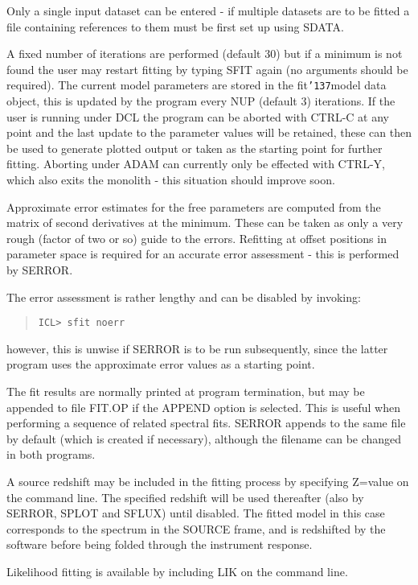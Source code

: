 \documentclass{book}
\renewcommand{\_}{{\tt\char'137}}     %
\begin{document}
Only a single input dataset can be entered - if multiple datasets
are to be fitted a file containing references to them must be
first set up using SDATA.
 
A fixed number of iterations are performed (default 30) but if a
minimum is not found the user may restart fitting by typing SFIT
again (no arguments should be required). The current model
parameters are stored in the fit\_model data object, this is
updated by the program every NUP (default 3) iterations. If the
user is running under DCL the program can be aborted with CTRL-C at
any point and the last update to the parameter values will be
retained, these can then be used to generate plotted output or
taken as the starting point for further fitting. Aborting under
ADAM can currently only be effected with CTRL-Y, which also exits
the monolith - this situation should improve soon.
 
Approximate error estimates for the free parameters are computed
from the matrix of second derivatives at the minimum. These can
be taken as only a very rough (factor of two or so) guide to the
errors. Refitting at offset positions in parameter space is
required for an accurate error assessment - this is performed by
SERROR.
 
The error assessment is rather lengthy and can be disabled by
invoking:
\begin{quote}\begin{verbatim}
ICL> sfit noerr
\end{verbatim}\end{quote}
however, this is unwise if SERROR is to be run subsequently,
since the latter program uses the approximate error values as a
starting point.
 
The fit results are normally printed at program termination, but
may be appended to file FIT.OP if the APPEND option is selected.
This is useful when performing a sequence of related spectral
fits. SERROR appends to the same file by default (which is created
if necessary), although the filename can be changed in both programs.
 
A source redshift may be included in the fitting process by
specifying Z=value on the command line. The specified redshift
will be used thereafter (also by SERROR, SPLOT and SFLUX) until
disabled. The fitted model in this case corresponds to the
spectrum in the SOURCE frame, and is redshifted by the software
before being folded through the instrument response.
 
Likelihood fitting is available by including LIK on the
command line.
 
\end{document}
